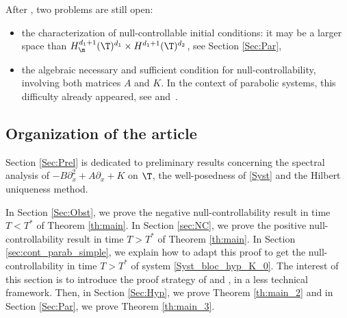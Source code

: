 \pagebreak[2]
After , two problems are still open:
\begin{itemize}
\item the characterization of null-controllable initial conditions: it may be a larger space than $H^{d_1+1}_\m(\T)^{d_1} \times H^{d_1+1}(\T)^{d_2}$, see Section \ref{Sec:Par},
\item the algebraic necessary and sufficient condition for null-controllability, involving both matrices $A$ and $K$. In the context of parabolic systems, this difficulty already appeared, see \cite{ammarkhodja_2009} and~\cite{duprez_2016a}.
\end{itemize}

\subsection{Organization of the article}

Section \ref{Sec:Prel} is dedicated to preliminary results concerning the spectral analysis of $-B\partial_x^2+A\partial_x+K$ on $\T$, the well-posedness of \eqref{Syst} and the Hilbert uniqueness method.

In Section \ref{Sec:Obst}, we prove the negative null-controllability result in time $T<T^\ast$ of Theorem \ref{th:main}. In Section \ref{sec:NC}, we prove the positive null-controllability result in time $T>T^\ast$ of Theorem \ref{th:main}. In Section \ref{sec:cont_parab_simple}, we explain how to adapt this proof to get the null-controllability in time $T>T^\ast$ of system \eqref{Syst_bloc_hyp_K_0}. The interest of this section is to introduce the proof strategy of  and , in a less technical framework. Then, in Section \ref{Sec:Hyp}, we prove Theorem \ref{th:main_2} and in Section \ref{Sec:Par}, we prove Theorem \ref{th:main_3}.


